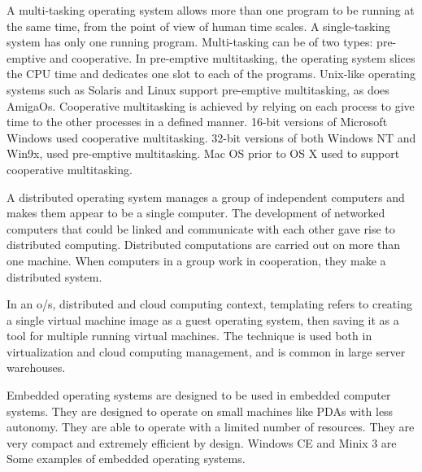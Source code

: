 \documentclass{full}
\begin{document}
A multi-tasking operating system allows more than one program to be running at
the same time, from the point of view of human time scales. A single-tasking
system has only one running program. Multi-tasking can be of two types:
pre-emptive and cooperative. In pre-emptive multitasking, the operating system
slices the CPU time and dedicates one slot to each of the programs. Unix-like
operating systems such as Solaris and Linux support pre-emptive multitasking, as
does AmigaOs. Cooperative multitasking is achieved by relying on each process to
give time to the other processes in a defined manner. 16-bit versions of
Microsoft Windows used cooperative multitasking. 32-bit versions of both Windows
NT and Win9x, used pre-emptive multitasking. Mac OS prior to OS X used to
support cooperative multitasking.

A distributed operating system manages a group of independent computers and
makes them appear to be a single computer. The development of networked
computers that could be linked and communicate with each other gave rise to
distributed computing. Distributed computations are carried out on more than one
machine. When computers in a group work in cooperation, they make a distributed
system.

In an o/s, distributed and cloud computing context, templating refers to
creating a single virtual machine image as a guest operating system, then saving
it as a tool for multiple running virtual machines. The technique is used both
in virtualization and cloud computing management, and is common in large server
warehouses.

Embedded operating systems are designed to be used in embedded computer systems.
They are designed to operate on small machines like PDAs with less autonomy.
They are able to operate with a limited number of resources. They are very
compact and extremely efficient by design. Windows CE and Minix 3 are Some
examples of embedded operating systems.
\end{document}
